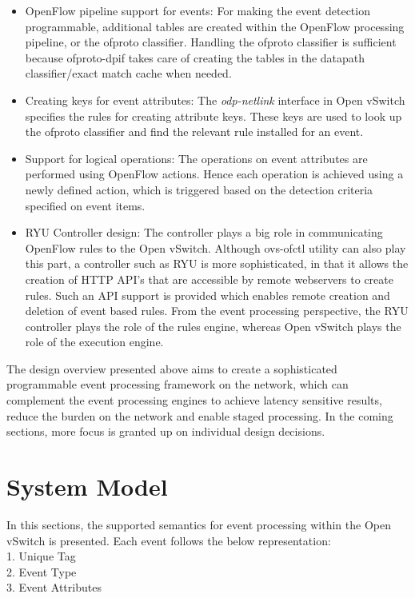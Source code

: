 \begin{itemize}
\begin{figure}[H]
\end{figure}
 \item OpenFlow pipeline support for events: For making the event detection programmable, additional tables are created within the OpenFlow processing pipeline, or the ofproto classifier. Handling the ofproto classifier is sufficient because ofproto-dpif takes care of creating the tables in the datapath classifier/exact match cache when needed.
 \item Creating keys for event attributes: The \textit{odp-netlink} interface in Open vSwitch specifies the rules for creating attribute keys. These keys are used to look up the ofproto classifier and find the relevant rule installed for an event. 
 \item Support for logical operations: The operations on event attributes are performed using OpenFlow actions. Hence each operation is achieved using a newly defined action, which is triggered based on the detection criteria specified on event items.
 \item RYU Controller design: The controller plays a big role in communicating OpenFlow rules to the Open vSwitch. Although ovs-ofctl utility can also play this part, a controller such as RYU is more sophisticated, in that it allows the creation of HTTP API's that are accessible by remote webservers to create rules. Such an API support is provided which enables remote creation and deletion of event based rules. From the event processing perspective, the RYU controller plays the role of the rules engine, whereas Open vSwitch plays the role of the execution engine. 
\end{itemize}

The design overview presented above aims to create a sophisticated programmable event processing framework on the network, which can complement the event processing engines to achieve latency sensitive results, reduce the burden on the network and enable staged processing. In the coming sections, more focus is granted up on individual design decisions.


\section{System Model}
In this sections, the supported semantics for event processing within the Open vSwitch is presented. Each event follows the below representation:\\1. Unique Tag\\
2. Event Type\\3. Event Attributes


